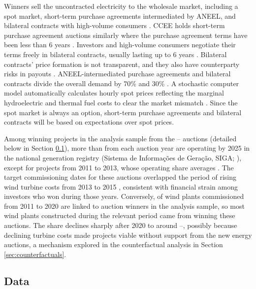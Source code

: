\documentclass[12pt]{article}
\theoremstyle{definition} %
\begin{document}
Winners sell the uncontracted electricity to the wholesale market, including a spot market, short-term purchase agreements intermediated by ANEEL, and bilateral contracts with high-volume consumers \citep{Hochberg2021}. CCEE holds short-term purchase agreement auctions similarly where the purchase agreement terms have been less than 6 years \citep{CCEE2024}. Investors and high-volume consumers negotiate their terms freely in bilateral contracts, usually lasting up to 6 years \citep{Perez2024}. Bilateral contracts' price formation is not transparent, and they also have counterparty risks in payouts \citep{CCEE2012}. ANEEL-intermediated purchase agreements and bilateral contracts divide the overall demand by 70\% and 30\% \citep{Perez2024}. A stochastic computer model automatically calculates hourly spot prices reflecting the marginal hydroelectric and thermal fuel costs to clear the market mismatch \citep{Hochberg2021,Perez2024}. Since the spot market is always an option, short-term purchase agreements and bilateral contracts will be based on expectations over spot prices.

Among winning projects in the analysis sample from the -- auctions (detailed below in Section \ref{sec:data}), more than  from each auction year are operating by 2025 in the national generation registry (Sistema de Informações de Geração, SIGA; \citealp{ANEEL2026}), except for projects from 2011 to 2013, whose operating share averages . The target commissioning dates for these auctions overlapped the period of rising wind turbine costs from 2013 to 2015 \citep{Tolmasquim2021}, consistent with financial strain among investors who won during those years. Conversely,  of wind plants commissioned from 2011 to 2020 are linked to auction winners in the analysis sample, so most wind plants constructed during the relevant period came from winning these auctions. The share declines sharply after 2020 to around --, possibly because declining turbine costs made projects viable without support from the new energy auctions, a mechanism explored in the counterfactual analysis in Section \ref{sec:counterfactuals}.

\subsection{Data}
\label{sec:data}
\end{document}
